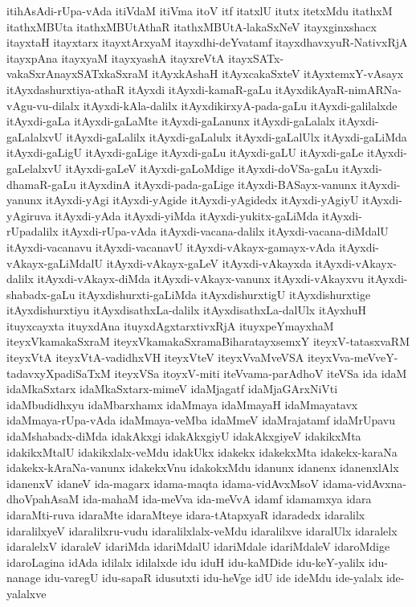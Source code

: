 {itihAsAdi-rUpa-vAda
itiVdaM
itiVma
itoV
itf
itatxlU
itutx
itetxMdu
itathxM
itathxMBUta
itathxMBUtAthaR
itathxMBUtA-lakaSxNeV
itayxginxshacx
itayxtaH
itayxtarx
itayxtArxyaM
itayxdhi-deYvatamf
itayxdhavxyuR-NativxRjA
itayxpAna
itayxyaM
itayxyashA
itayxreVtA
itayxSATx-vakaSxrAnayxSATxkaSxraM
itAyxkAshaH
itAyxcakaSxteV
itAyxtemxY-vAsayx
itAyxdashurxtiya-athaR
itAyxdi
itAyxdi-kamaR-gaLu
itAyxdikAyaR-nimARNa-vAgu-vu-dilalx
itAyxdi-kAla-dalilx
itAyxdikirxyA-pada-gaLu
itAyxdi-galilalxde
itAyxdi-gaLa
itAyxdi-gaLaMte
itAyxdi-gaLanunx
itAyxdi-gaLalalx
itAyxdi-gaLalalxvU
itAyxdi-gaLalilx
itAyxdi-gaLalulx
itAyxdi-gaLalUlx
itAyxdi-gaLiMda
itAyxdi-gaLigU
itAyxdi-gaLige
itAyxdi-gaLu
itAyxdi-gaLU
itAyxdi-gaLe
itAyxdi-gaLelalxvU
itAyxdi-gaLeV
itAyxdi-gaLoMdige
itAyxdi-doVSa-gaLu
itAyxdi-dhamaR-gaLu
itAyxdinA
itAyxdi-pada-gaLige
itAyxdi-BASayx-vanunx
itAyxdi-yanunx
itAyxdi-yAgi
itAyxdi-yAgide
itAyxdi-yAgidedx
itAyxdi-yAgiyU
itAyxdi-yAgiruva
itAyxdi-yAda
itAyxdi-yiMda
itAyxdi-yukitx-gaLiMda
itAyxdi-rUpadalilx
itAyxdi-rUpa-vAda
itAyxdi-vacana-dalilx
itAyxdi-vacana-diMdalU
itAyxdi-vacanavu
itAyxdi-vacanavU
itAyxdi-vAkayx-gamayx-vAda
itAyxdi-vAkayx-gaLiMdalU
itAyxdi-vAkayx-gaLeV
itAyxdi-vAkayxda
itAyxdi-vAkayx-dalilx
itAyxdi-vAkayx-diMda
itAyxdi-vAkayx-vanunx
itAyxdi-vAkayxvu
itAyxdi-shabadx-gaLu
itAyxdishurxti-gaLiMda
itAyxdishurxtigU
itAyxdishurxtige
itAyxdishurxtiyu
itAyxdisathxLa-dalilx
itAyxdisathxLa-dalUlx
itAyxhuH
ituyxcayxta
ituyxdAna
ituyxdAgxtarxtivxRjA
ituyxpeYmayxhaM
iteyxVkamakaSxraM
iteyxVkamakaSxramaBiharatayxsemxY
iteyxV-tatasxvaRM
iteyxVtA
iteyxVtA-vadidhxVH
iteyxVteV
iteyxVvaMveVSA
iteyxVva-meVveY-tadavxyXpadiSaTxM
iteyxVSa
itoyxV-miti
iteVvama-parAdhoV
iteVSa
ida
idaM
idaMkaSxtarx
idaMkaSxtarx-mimeV
idaMjagatf
idaMjaGArxNiVti
idaMbudidhxyu
idaMbarxhamx
idaMmaya
idaMmayaH
idaMmayatavx
idaMmaya-rUpa-vAda
idaMmaya-veMba
idaMmeV
idaMrajatamf
idaMrUpavu
idaMshabadx-diMda
idakAkxgi
idakAkxgiyU
idakAkxgiyeV
idakikxMta
idakikxMtalU
idakikxlalx-veMdu
idakUkx
idakekx
idakekxMta
idakekx-karaNa
idakekx-kAraNa-vanunx
idakekxVnu
idakokxMdu
idanunx
idanenx
idanenxlAlx
idanenxV
idaneV
ida-magarx
idama-maqta
idama-vidAvxMsoV
idama-vidAvxna-dhoVpahAsaM
ida-mahaM
ida-meVva
ida-meVvA
idamf
idamamxya
idara
idaraMti-ruva
idaraMte
idaraMteye
idara-tAtapxyaR
idaradedx
idaralilx
idaralilxyeV
idaralilxru-vudu
idaralilxlalx-veMdu
idaralilxve
idaralUlx
idaralelx
idaralelxV
idaraleV
idariMda
idariMdalU
idariMdale
idariMdaleV
idaroMdige
idaroLagina
idAda
idilalx
idilalxde
idu
iduH
idu-kaMDide
idu-keY-yalilx
idu-nanage
idu-varegU
idu-sapaR
idusutxti
idu-heVge
idU
ide
ideMdu
ide-yalalx
ide-yalalxve
}
